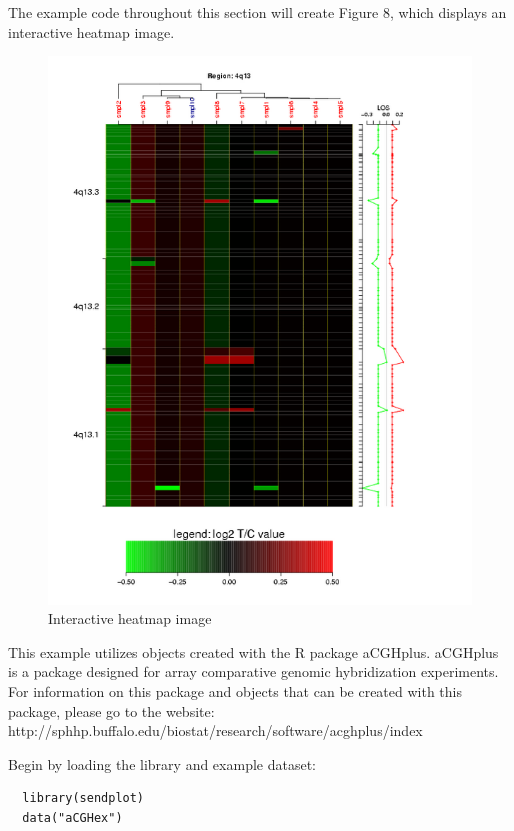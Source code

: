 \documentclass[]{article}
\begin{document}
\indent The example code throughout this section will create Figure 8, which displays an interactive heatmap image. 
\begin{center}
\begin{figure}
\includegraphics{test}
\caption{Interactive heatmap image}
\end{figure}
\end{center}

 This example utilizes objects created with the R package aCGHplus. aCGHplus is a package designed for array comparative genomic hybridization experiments. For information on this package and objects that can be created with this package, please go to the website: \\http://sphhp.buffalo.edu/biostat/research/software/acghplus/index

\indent Begin by loading the library and example dataset:

\begin{verbatim}
  library(sendplot)
  data("aCGHex")
\end{verbatim}
\end{document}
